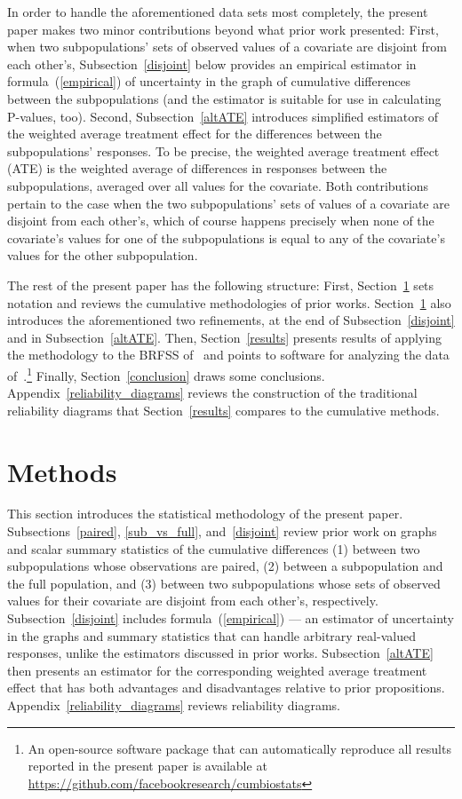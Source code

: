 \documentclass[]{fairmeta}
\begin{document}
In order to handle the aforementioned data sets most completely, the present
paper makes two minor contributions beyond what prior work presented:
First, when two subpopulations' sets of observed values of a covariate
are disjoint from each other's, Subsection~\ref{disjoint} below provides
an empirical estimator in formula~(\ref{empirical}) of uncertainty
in the graph of cumulative differences between the subpopulations
(and the estimator is suitable for use in calculating P-values, too).
Second, Subsection~\ref{altATE} introduces simplified estimators
of the weighted average treatment effect
for the differences between the subpopulations' responses.
To be precise, the weighted average treatment effect (ATE)
is the weighted average of differences in responses
between the subpopulations, averaged over all values for the covariate.
Both contributions pertain to the case when the two subpopulations' sets
of values of a covariate are disjoint from each other's, which of course
happens precisely when none of the covariate's values
for one of the subpopulations is equal to any of the covariate's values
for the other subpopulation.

The rest of the present paper has the following structure: First,
Section~\ref{methods} sets notation and reviews the cumulative methodologies
of prior works. Section~\ref{methods} also introduces
the aforementioned two refinements, at the end of Subsection~\ref{disjoint}
and in Subsection~\ref{altATE}.
Then, Section~\ref{results} presents results of applying the methodology
to the BRFSS of~\cite{brfss} and points to software for analyzing the data
of~\cite{taylor-mickel}.\footnote{An open-source software package
that can automatically reproduce all results reported in the present paper
is available at \url{https://github.com/facebookresearch/cumbiostats}}
Finally, Section~\ref{conclusion} draws some conclusions.
Appendix~\ref{reliability_diagrams} reviews the construction
of the traditional reliability diagrams that Section~\ref{results} compares
to the cumulative methods.



\section{Methods}
\label{methods}

This section introduces the statistical methodology of the present paper.
Subsections~\ref{paired}, \ref{sub_vs_full}, and~\ref{disjoint}
review prior work on graphs and scalar summary statistics
of the cumulative differences (1) between two subpopulations whose observations
are paired, (2) between a subpopulation and the full population,
and (3) between two subpopulations whose sets of observed values
for their covariate are disjoint from each other's, respectively.
Subsection~\ref{disjoint} includes formula~(\ref{empirical}) ---
an estimator of uncertainty in the graphs and summary statistics
that can handle arbitrary real-valued responses,
unlike the estimators discussed in prior works.
Subsection~\ref{altATE} then presents an estimator
for the corresponding weighted average treatment effect that has
both advantages and disadvantages relative to prior propositions.
Appendix~\ref{reliability_diagrams} reviews reliability diagrams.
\end{document}
